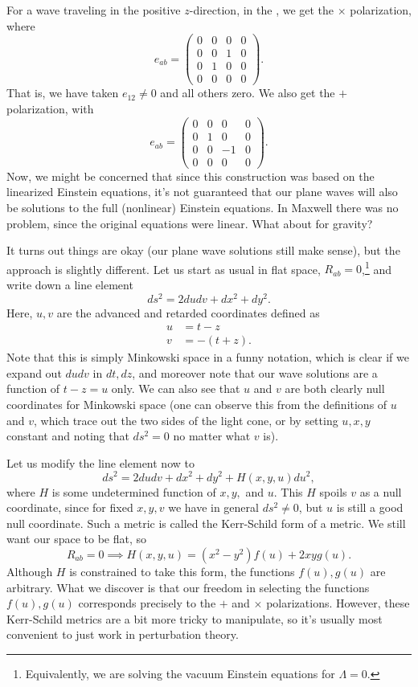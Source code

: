 For a wave traveling in the positive $z$-direction, in the , we get the $\times$ polarization, where
$$e_{ab}=\begin{pmatrix}
0&0&0&0\\
0&0&1&0\\
0&1&0&0\\
0&0&0&0
\end{pmatrix}.$$
That is, we have taken $e_{12}\neq 0$ and all others zero. We also get the $+$ polarization, with
$$e_{ab}=\begin{pmatrix}
0&0&0&0\\
0&1&0&0\\
0&0&-1&0\\
0&0&0&0
\end{pmatrix}.$$
Now, we might be concerned that since this construction was based on the linearized Einstein equations, it's not guaranteed that our plane waves will also be solutions to the full (nonlinear) Einstein equations. In Maxwell there was no problem, since the original equations were linear. What about for gravity?

It turns out things are okay (our plane wave solutions still make sense), but the approach is slightly different. Let us start as usual in flat space, $R_{ab}=0$,\footnote{Equivalently, we are solving the vacuum Einstein equations for $\Lambda=0$.} and write down a line element
$$ds^2=2dudv + dx^2+dy^2.$$
Here, $u,v$ are the advanced and retarded coordinates defined as
\begin{align*}
    u&= t-z\\
    v&=-(t+z).
\end{align*}
Note that this is simply Minkowski space in a funny notation, which is clear if we expand out $dudv$ in $dt,dz$, and moreover note that our wave solutions are a function of $t-z=u$ only. We can also see that $u$ and $v$ are both clearly null coordinates for Minkowski space (one can observe this from the definitions of $u$ and $v$, which trace out the two sides of the light cone, or by setting $u,x,y$ constant and noting that $ds^2=0$ no matter what $v$ is). 

Let us modify the line element now to
$$ds^2=2dudv + dx^2+dy^2+H(x,y,u)du^2,$$
where $H$ is some undetermined function of $x,y,$ and $u$. This $H$ spoils $v$ as a null coordinate, since for fixed $x,y,v$ we have in general $ds^2\neq 0$, but $u$ is still a good null coordinate. Such a metric is called the Kerr-Schild form of a metric. We still want our space to be flat, so
$$R_{ab}=0 \implies H(x,y,u)=(x^2-y^2)f(u)+2xy g(u).$$
Although $H$ is constrained to take this form, the functions $f(u),g(u)$ are arbitrary. What we discover is that our freedom in selecting the functions $f(u),g(u)$ corresponds precisely to the $+$ and $\times$ polarizations. However, these Kerr-Schild metrics are a bit more tricky to manipulate, so it's usually most convenient to just work in perturbation theory.

